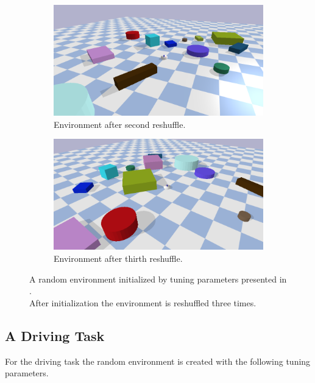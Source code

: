\begin{figure}[H]
    \vspace{0.2cm}
    \begin{subfigure}{.49\textwidth}
    \includegraphics[width=\textwidth]{figures/results/random3}
    \caption{Environment after second reshuffle.}
    \end{subfigure}
    \hfill
    \begin{subfigure}{.49\textwidth}
    \centering
    \includegraphics[width=\textwidth]{figures/results/random4}
    \caption{Environment after thirth reshuffle.}
    \end{subfigure}
    \caption{A random environment initialized by tuning parameters presented in .\\After initialization the environment is reshuffled three times.}%
    \label{fig:random_environment_reshuffle}
\end{figure}

\subsection{A Driving Task}%
\label{subsec:rand_driving}
For the driving task the random environment is created with the following tuning parameters.\bs

